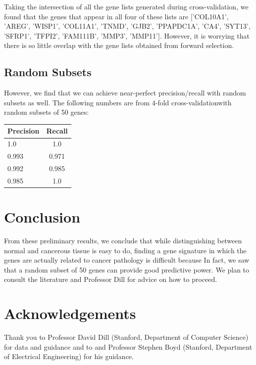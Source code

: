 \documentclass[11pt]{article}
\begin{document}
Taking the intersection of all the gene lists generated during cross-validation, we found that the genes that appear in all four of these lists are $[$'COL10A1', 'AREG', 'WISP1', 'COL11A1', 'TNMD', 'GJB2', 'PPAPDC1A', 'CA4', 'SYT13', 'SFRP1', 'TFPI2', 'FAM111B', 'MMP3', 'MMP11'$]$. However, it is worrying that there is so little overlap with the gene lists obtained from forward selection.

\subsection{Random Subsets}

However, we find that we can achieve near-perfect precision/recall with random subsets as well. The following numbers are from 4-fold cross-validationwith random subsets of 50 genes:
\begin{tabular}{ l | c }
    Precision & Recall\\
  \hline 
    1.0 & 1.0 \\
    0.993 & 0.971 \\
    0.992 & 0.985 \\
    0.985 & 1.0 \\
  \hline
\end{tabular}
\section{Conclusion}
From these preliminary results, we conclude that while distinguishing between normal and cancerous tissue is easy to do, finding a gene signature in which the genes are actually related to cancer pathology is difficult because In fact, we saw that a random subset of 50 genes can provide good predictive power. We plan to consult the literature and Professor Dill for advice on how to proceed. 

\section{Acknowledgements}
Thank you to Professor David Dill (Stanford, Department of Computer Science) for data and guidance and to and Professor Stephen Boyd (Stanford, Department of Electrical Engineering) for his guidance.
\end{document}
